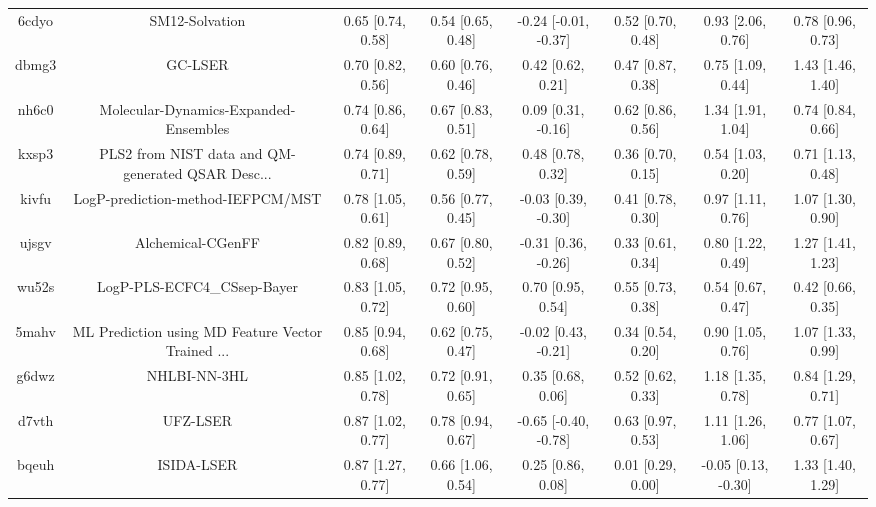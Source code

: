\documentclass{article}
\begin{document}
\begin{center}
\begin{longtable}{|cccccccc|}
 6cdyo &                                     SM12-Solvation &  0.65 [0.74, 0.58] &  0.54 [0.65, 0.48] &  -0.24 [-0.01, -0.37] &  0.52 [0.70, 0.48] &     0.93 [2.06, 0.76] &     0.78 [0.96, 0.73] \\
 dbmg3 &                                            GC-LSER &  0.70 [0.82, 0.56] &  0.60 [0.76, 0.46] &     0.42 [0.62, 0.21] &  0.47 [0.87, 0.38] &     0.75 [1.09, 0.44] &     1.43 [1.46, 1.40] \\
 nh6c0 &              Molecular-Dynamics-Expanded-Ensembles &  0.74 [0.86, 0.64] &  0.67 [0.83, 0.51] &    0.09 [0.31, -0.16] &  0.62 [0.86, 0.56] &     1.34 [1.91, 1.04] &     0.74 [0.84, 0.66] \\
 kxsp3 &  PLS2 from NIST data and QM-generated QSAR Desc... &  0.74 [0.89, 0.71] &  0.62 [0.78, 0.59] &     0.48 [0.78, 0.32] &  0.36 [0.70, 0.15] &     0.54 [1.03, 0.20] &     0.71 [1.13, 0.48] \\
 kivfu &                  LogP-prediction-method-IEFPCM/MST &  0.78 [1.05, 0.61] &  0.56 [0.77, 0.45] &   -0.03 [0.39, -0.30] &  0.41 [0.78, 0.30] &     0.97 [1.11, 0.76] &     1.07 [1.30, 0.90] \\
 ujsgv &                                  Alchemical-CGenFF &  0.82 [0.89, 0.68] &  0.67 [0.80, 0.52] &   -0.31 [0.36, -0.26] &  0.33 [0.61, 0.34] &     0.80 [1.22, 0.49] &     1.27 [1.41, 1.23] \\
 wu52s &                        LogP-PLS-ECFC4\_CSsep-Bayer &  0.83 [1.05, 0.72] &  0.72 [0.95, 0.60] &     0.70 [0.95, 0.54] &  0.55 [0.73, 0.38] &     0.54 [0.67, 0.47] &     0.42 [0.66, 0.35] \\
 5mahv &  ML Prediction using MD Feature Vector Trained ... &  0.85 [0.94, 0.68] &  0.62 [0.75, 0.47] &   -0.02 [0.43, -0.21] &  0.34 [0.54, 0.20] &     0.90 [1.05, 0.76] &     1.07 [1.33, 0.99] \\
 g6dwz &                                       NHLBI-NN-3HL &  0.85 [1.02, 0.78] &  0.72 [0.91, 0.65] &     0.35 [0.68, 0.06] &  0.52 [0.62, 0.33] &     1.18 [1.35, 0.78] &     0.84 [1.29, 0.71] \\
 d7vth &                                           UFZ-LSER &  0.87 [1.02, 0.77] &  0.78 [0.94, 0.67] &  -0.65 [-0.40, -0.78] &  0.63 [0.97, 0.53] &     1.11 [1.26, 1.06] &     0.77 [1.07, 0.67] \\
 bqeuh &                                         ISIDA-LSER &  0.87 [1.27, 0.77] &  0.66 [1.06, 0.54] &     0.25 [0.86, 0.08] &  0.01 [0.29, 0.00] &   -0.05 [0.13, -0.30] &     1.33 [1.40, 1.29] \\

\end{longtable}
\end{center}
\end{document}
